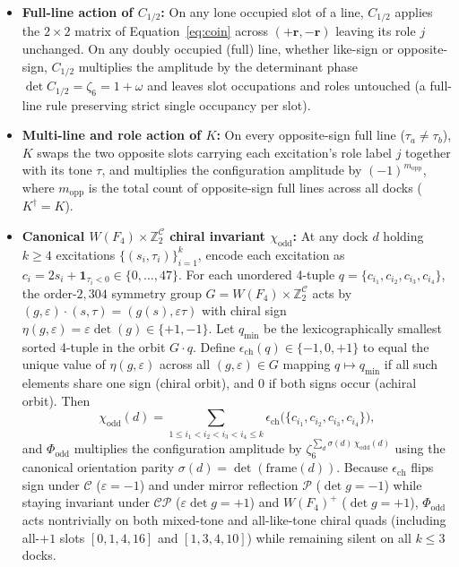 \begin{itemize}[itemsep=2pt]
\item \textbf{Full-line action of $C_{1/2}$:} On any lone occupied slot of a line, $C_{1/2}$ applies the $2 \times 2$
matrix of Equation~\eqref{eq:coin} across $(+\mathbf{r}, -\mathbf{r})$ leaving its role $j$ unchanged. On any doubly
occupied (full) line, whether like-sign or opposite-sign, $C_{1/2}$ multiplies the amplitude by the determinant phase
$\det C_{1/2} = \zeta_6 = 1 + \omega$ and leaves slot occupations and roles untouched (a full-line rule
preserving strict single occupancy per slot).
\item \textbf{Multi-line and role action of $K$:} On every opposite-sign full line ($\tau_a \neq \tau_b$), $K$ swaps
the two opposite slots carrying each excitation's role label $j$ together with its tone $\tau$, and multiplies the
configuration amplitude by $(-1)^{m_{\mathrm{opp}}}$, where $m_{\mathrm{opp}}$ is the total count of opposite-sign
full lines across all docks ($K^\dagger = K$).
\item \textbf{Canonical $W(F_4) \times \mathbb{Z}_2^{\mathcal{C}}$ chiral invariant $\chi_{\mathrm{odd}}$:} At any
dock $d$ holding $k \ge 4$ excitations $\{(s_i, \tau_i)\}_{i=1}^k$, encode each excitation as
$c_i = 2 s_i + \mathbf{1}_{\tau_i < 0} \in \{0, \ldots, 47\}$. For each unordered 4-tuple
$q = \{c_{i_1}, c_{i_2}, c_{i_3}, c_{i_4}\}$, the order-$2{,}304$ symmetry group $G = W(F_4) \times \mathbb{Z}_2^{\mathcal{C}}$
acts by $(g, \varepsilon) \cdot (s, \tau) = (g(s), \varepsilon \tau)$ with chiral sign
$\eta(g, \varepsilon) = \varepsilon \det(g) \in \{+1, -1\}$. Let $q_{\min}$ be the lexicographically smallest sorted
4-tuple in the orbit $G \cdot q$. Define $\epsilon_{\mathrm{ch}}(q) \in \{-1, 0, +1\}$ to equal the unique value of
$\eta(g, \varepsilon)$ across all $(g, \varepsilon) \in G$ mapping $q \mapsto q_{\min}$ if all such elements share one
sign (chiral orbit), and $0$ if both signs occur (achiral orbit). Then
\begin{equation}
\chi_{\mathrm{odd}}(d) = \sum_{1 \le i_1 < i_2 < i_3 < i_4 \le k}
\epsilon_{\mathrm{ch}}\bigl(\{c_{i_1}, c_{i_2}, c_{i_3}, c_{i_4}\}\bigr),
\label{eq:chi-odd}
\end{equation}
and $\Phi_{\mathrm{odd}}$ multiplies the configuration amplitude by $\zeta_6^{\sum_d \sigma(d)\,\chi_{\mathrm{odd}}(d)}$
using the canonical orientation parity $\sigma(d) = \det(\mathrm{frame}(d))$. Because $\epsilon_{\mathrm{ch}}$ flips
sign under $\mathcal{C}$ ($\varepsilon = -1$) and under mirror reflection $\mathcal{P}$ ($\det g = -1$) while staying
invariant under $\mathcal{CP}$ ($\varepsilon \det g = +1$) and $W(F_4)^+$ ($\det g = +1$), $\Phi_{\mathrm{odd}}$ acts
nontrivially on both mixed-tone and all-like-tone chiral quads (including all-$+1$ slots $[0, 1, 4, 16]$ and
$[1, 3, 4, 10]$) while remaining silent on all $k \le 3$ docks.
\end{itemize}

